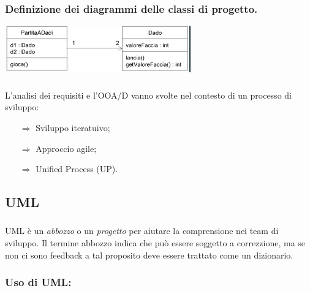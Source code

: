 {\subsubsection{Definizione dei diagrammi delle classi di progetto.}

\begin{center}
    \includegraphics[scale=0.7]{images/Dadi 3.png}
\end{center}

}
\subsubsection{}
L'analisi dei requisiti e l'OOA/D vanno svolte nel contesto di un processo di sviluppo:

\begin{itemize}
    \item [$\Rightarrow$] Sviluppo iteratuivo;
    \item [$\Rightarrow$] Approccio agile;
    \item [$\Rightarrow$] Unified Process (UP).
\end{itemize}

\pagebreak

\subsection{UML}

\subsubsection{}
UML è un \textit{abbozzo} o un \textit{progetto} per aiutare la comprensione nei team di sviluppo.
Il termine abbozzo indica che può essere soggetto a correzzione, ma se non ci 
sono feedback a tal proposito deve essere trattato come un dizionario.

\subsubsection{Uso di UML:}

